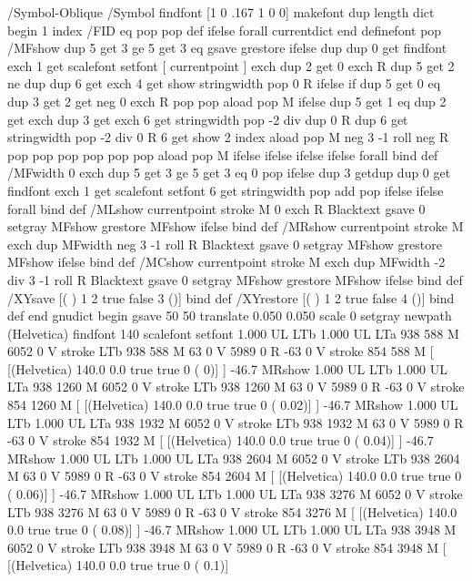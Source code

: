 %
/Symbol-Oblique /Symbol findfont [1 0 .167 1 0 0] makefont
dup length dict begin {1 index /FID eq {pop pop} {def} ifelse} forall
currentdict end definefont pop
/MFshow {
   { dup 5 get 3 ge
     { 5 get 3 eq {gsave} {grestore} ifelse }
     {dup dup 0 get findfont exch 1 get scalefont setfont
     [ currentpoint ] exch dup 2 get 0 exch R dup 5 get 2 ne {dup dup 6
     get exch 4 get {show} {stringwidth pop 0 R} ifelse }if dup 5 get 0 eq
     {dup 3 get {2 get neg 0 exch R pop} {pop aload pop M} ifelse} {dup 5
     get 1 eq {dup 2 get exch dup 3 get exch 6 get stringwidth pop -2 div
     dup 0 R} {dup 6 get stringwidth pop -2 div 0 R 6 get
     show 2 index {aload pop M neg 3 -1 roll neg R pop pop} {pop pop pop
     pop aload pop M} ifelse }ifelse }ifelse }
     ifelse }
   forall} bind def
/MFwidth {0 exch { dup 5 get 3 ge { 5 get 3 eq { 0 } { pop } ifelse }
 {dup 3 get{dup dup 0 get findfont exch 1 get scalefont setfont
     6 get stringwidth pop add} {pop} ifelse} ifelse} forall} bind def
/MLshow { currentpoint stroke M
  0 exch R
  Blacktext {gsave 0 setgray MFshow grestore} {MFshow} ifelse } bind def
/MRshow { currentpoint stroke M
  exch dup MFwidth neg 3 -1 roll R
  Blacktext {gsave 0 setgray MFshow grestore} {MFshow} ifelse } bind def
/MCshow { currentpoint stroke M
  exch dup MFwidth -2 div 3 -1 roll R
  Blacktext {gsave 0 setgray MFshow grestore} {MFshow} ifelse } bind def
/XYsave    { [( ) 1 2 true false 3 ()] } bind def
/XYrestore { [( ) 1 2 true false 4 ()] } bind def
end
gnudict begin
gsave
50 50 translate
0.050 0.050 scale
0 setgray
newpath
(Helvetica) findfont 140 scalefont setfont
1.000 UL
LTb
1.000 UL
LTa
938 588 M
6052 0 V
stroke
LTb
938 588 M
63 0 V
5989 0 R
-63 0 V
stroke
854 588 M
[ [(Helvetica) 140.0 0.0 true true 0 ( 0)]
] -46.7 MRshow
1.000 UL
LTb
1.000 UL
LTa
938 1260 M
6052 0 V
stroke
LTb
938 1260 M
63 0 V
5989 0 R
-63 0 V
stroke
854 1260 M
[ [(Helvetica) 140.0 0.0 true true 0 ( 0.02)]
] -46.7 MRshow
1.000 UL
LTb
1.000 UL
LTa
938 1932 M
6052 0 V
stroke
LTb
938 1932 M
63 0 V
5989 0 R
-63 0 V
stroke
854 1932 M
[ [(Helvetica) 140.0 0.0 true true 0 ( 0.04)]
] -46.7 MRshow
1.000 UL
LTb
1.000 UL
LTa
938 2604 M
6052 0 V
stroke
LTb
938 2604 M
63 0 V
5989 0 R
-63 0 V
stroke
854 2604 M
[ [(Helvetica) 140.0 0.0 true true 0 ( 0.06)]
] -46.7 MRshow
1.000 UL
LTb
1.000 UL
LTa
938 3276 M
6052 0 V
stroke
LTb
938 3276 M
63 0 V
5989 0 R
-63 0 V
stroke
854 3276 M
[ [(Helvetica) 140.0 0.0 true true 0 ( 0.08)]
] -46.7 MRshow
1.000 UL
LTb
1.000 UL
LTa
938 3948 M
6052 0 V
stroke
LTb
938 3948 M
63 0 V
5989 0 R
-63 0 V
stroke
854 3948 M
[ [(Helvetica) 140.0 0.0 true true 0 ( 0.1)]
